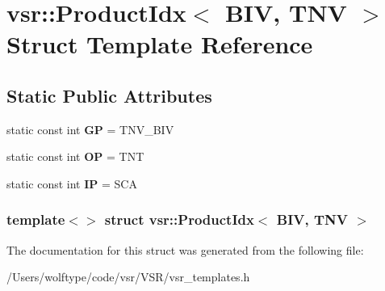 \hypertarget{structvsr_1_1_product_idx_3_01_b_i_v_00_01_t_n_v_01_4}{\section{vsr\-:\-:Product\-Idx$<$ B\-I\-V, T\-N\-V $>$ Struct Template Reference}
\label{structvsr_1_1_product_idx_3_01_b_i_v_00_01_t_n_v_01_4}
}
\subsection*{Static Public Attributes}
\begin{DoxyCompactItemize}
\item 
\hypertarget{structvsr_1_1_product_idx_3_01_b_i_v_00_01_t_n_v_01_4_abdc5e4412cbdf987d77941a844b7da74}{static const int {\bfseries G\-P} = T\-N\-V\-\_\-\-B\-I\-V}\label{structvsr_1_1_product_idx_3_01_b_i_v_00_01_t_n_v_01_4_abdc5e4412cbdf987d77941a844b7da74}

\item 
\hypertarget{structvsr_1_1_product_idx_3_01_b_i_v_00_01_t_n_v_01_4_ab528a745f3af69a6bfd47fe087d4a133}{static const int {\bfseries O\-P} = T\-N\-T}\label{structvsr_1_1_product_idx_3_01_b_i_v_00_01_t_n_v_01_4_ab528a745f3af69a6bfd47fe087d4a133}

\item 
\hypertarget{structvsr_1_1_product_idx_3_01_b_i_v_00_01_t_n_v_01_4_a76593b03173d587c580978c5c49006c9}{static const int {\bfseries I\-P} = S\-C\-A}\label{structvsr_1_1_product_idx_3_01_b_i_v_00_01_t_n_v_01_4_a76593b03173d587c580978c5c49006c9}

\end{DoxyCompactItemize}
\subsubsection*{template$<$$>$ struct vsr\-::\-Product\-Idx$<$ B\-I\-V, T\-N\-V $>$}



The documentation for this struct was generated from the following file\-:\begin{DoxyCompactItemize}
\item 
/\-Users/wolftype/code/vsr/\-V\-S\-R/vsr\-\_\-templates.\-h\end{DoxyCompactItemize}
